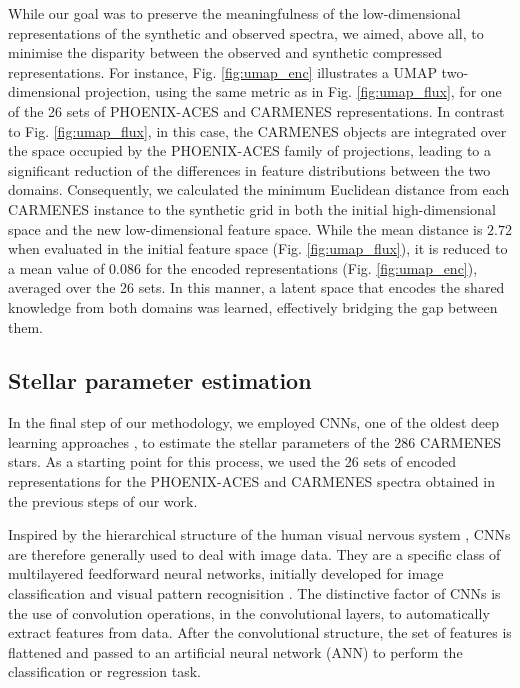 While our goal was to preserve the meaningfulness of the low-dimensional representations of the synthetic and observed spectra, we aimed, above all, to minimise the disparity between the observed and synthetic compressed representations. For instance, Fig. \ref{fig:umap_enc} illustrates a UMAP two-dimensional projection, using the same metric as in Fig. \ref{fig:umap_flux}, for one of the 26 sets of PHOENIX-ACES and CARMENES representations. In contrast to Fig. \ref{fig:umap_flux}, in this case, the CARMENES objects are integrated over the space occupied by the PHOENIX-ACES family of projections, leading to a significant reduction of the differences in feature distributions between the two domains. Consequently, we calculated the minimum Euclidean distance from each CARMENES instance to the synthetic grid in both the initial high-dimensional space and the new low-dimensional feature space. While the mean distance is $2.72$ when evaluated in the initial feature space (Fig. \ref{fig:umap_flux}), it is reduced to a mean value of $0.086$ for the encoded representations (Fig. \ref{fig:umap_enc}), averaged over the 26 sets.
In this manner, a latent space that encodes the shared knowledge from both domains was learned, effectively bridging the gap between them.


\subsection{Stellar parameter estimation} \label{acs_sec:cnn}

In the final step of our methodology, we employed CNNs, one of the oldest deep learning approaches \citep{lecun1998}, to estimate the stellar parameters of the 286 CARMENES stars. As a starting point for this process, we used the 26 sets of encoded representations for the PHOENIX-ACES and CARMENES spectra obtained in the previous steps of our work.

Inspired by the hierarchical structure of the human visual nervous system \citep[a precursor of CNNs; ][]{necognitron1980}, CNNs are therefore generally used to deal with image data. They are a specific class of multilayered feedforward neural networks, initially developed for image classification and visual pattern recognisition \citep{lecun1998,alexnet2012,vggnet2014}. The distinctive factor of CNNs is the use of convolution operations, in the convolutional layers, to automatically extract features from data. After the convolutional structure, the set of features is flattened and passed to an artificial neural network (ANN) to perform the classification or regression task.

